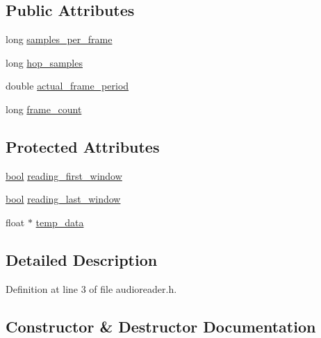 \subsection*{Public Attributes}
\begin{DoxyCompactItemize}
\item 
long \hyperlink{class_audio__reader_a3932b89b7f9a24ab2f41216e2c8e4a95}{samples\+\_\+per\+\_\+frame}
\item 
long \hyperlink{class_audio__reader_a535c41bffd9d2eca08697fa3a7848d2d}{hop\+\_\+samples}
\item 
double \hyperlink{class_audio__reader_a18f336bca2ab2d688bfe313a8fcdbb40}{actual\+\_\+frame\+\_\+period}
\item 
long \hyperlink{class_audio__reader_a611b81d8b494d5a1e9779bb9d8cbc018}{frame\+\_\+count}
\end{DoxyCompactItemize}
\subsection*{Protected Attributes}
\begin{DoxyCompactItemize}
\item 
\hyperlink{mac_2config_2i386_2lib-src_2libsoxr_2soxr-config_8h_abb452686968e48b67397da5f97445f5b}{bool} \hyperlink{class_audio__reader_aa9a58191cc8238882a2dcd909b1abe86}{reading\+\_\+first\+\_\+window}
\item 
\hyperlink{mac_2config_2i386_2lib-src_2libsoxr_2soxr-config_8h_abb452686968e48b67397da5f97445f5b}{bool} \hyperlink{class_audio__reader_a25b2f0807424d963bae6daa4b791a37b}{reading\+\_\+last\+\_\+window}
\item 
float $\ast$ \hyperlink{class_audio__reader_a11979e55124ff3492e16ec3855e92a4c}{temp\+\_\+data}
\end{DoxyCompactItemize}


\subsection{Detailed Description}


Definition at line 3 of file audioreader.\+h.



\subsection{Constructor \& Destructor Documentation}
